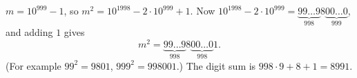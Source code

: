 $m=10^{999}-1$, so $m^2=10^{1998}-2\cdot10^{999}+1$. Now $10^{1998}-2\cdot10^{999}=\underbrace{99\ldots9}_{998}8\underbrace{00\ldots0}_{999}$, and adding $1$ gives
\[
m^2=\underbrace{99\ldots9}_{998}8\underbrace{00\ldots0}_{998}1 .
\]
(For example $99^2=9801$, $999^2=998001$.) The digit sum is $998\cdot9+8+1=\boxed{8991}$.
